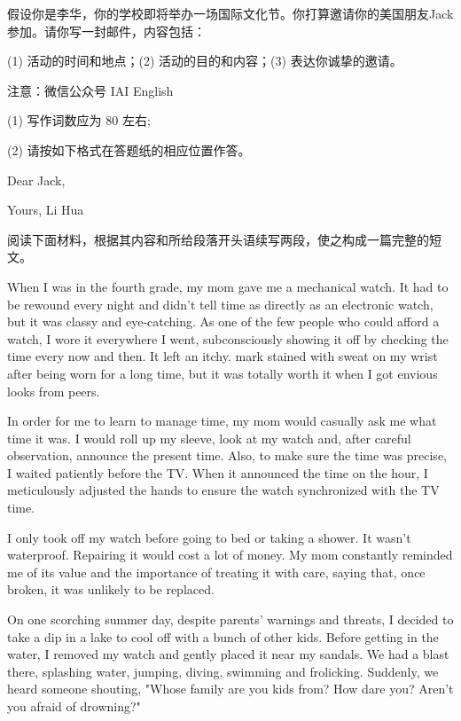 \documentclass{英语试卷}
\begin{document}
\par 假设你是李华，你的学校即将举办一场国际文化节。你打算邀请你的美国朋友Jack参加。请你写一封邮件，内容包括：\par
\par (1) 活动的时间和地点；(2) 活动的目的和内容；(3) 表达你诚挚的邀请。\par
\par 注意：微信公众号 IAI English\par
\par (1) 写作词数应为 80 左右;\par
\par (2) 请按如下格式在答题纸的相应位置作答。\par
\par Dear Jack,\par
\par Yours, Li Hua\par
{}
\par 阅读下面材料，根据其内容和所给段落开头语续写两段，使之构成一篇完整的短文。\par
\par When I was in the fourth grade, my mom gave me a mechanical watch. It had to be rewound every night and didn't tell time as directly as an electronic watch, but it was classy and eye-catching. As one of the few people who could afford a watch, I wore it everywhere I went, subconsciously showing it off by checking the time every now and then. It left an itchy. mark stained with sweat on my wrist after being worn for a long time, but it was totally worth it when I got envious looks from peers.\par
\par In order for me to learn to manage time, my mom would casually ask me what time it was. I would roll up my sleeve, look at my watch and, after careful observation, announce the present time. Also, to make sure the time was precise, I waited patiently before the TV. When it announced the time on the hour, I meticulously adjusted the hands to ensure the watch synchronized with the TV time.\par
\par I only took off my watch before going to bed or taking a shower. It wasn't waterproof. Repairing it would cost a lot of money. My mom constantly reminded me of its value and the importance of treating it with care, saying that, once broken, it was unlikely to be replaced.\par
\par On one scorching summer day, despite parents' warnings and threats, I decided to take a dip in a lake to cool off with a bunch of other kids. Before getting in the water, I removed my watch and gently placed it near my sandals. We had a blast there, splashing water, jumping, diving, swimming and frolicking. Suddenly, we heard someone shouting, "Whose family are you kids from? How dare you? Aren't you afraid of drowning?"\par
\end{document}
